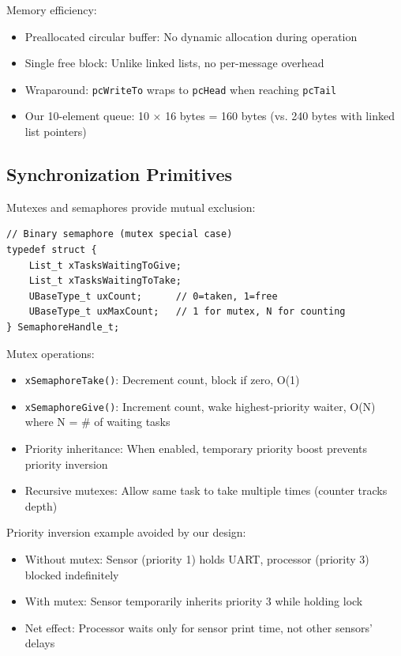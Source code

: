 \documentclass[conference]{IEEEtran}
\begin{document}
Memory efficiency:
\begin{itemize}
    \item Preallocated circular buffer: No dynamic allocation during operation
    \item Single free block: Unlike linked lists, no per-message overhead
    \item Wraparound: \texttt{pcWriteTo} wraps to \texttt{pcHead} when reaching \texttt{pcTail}
    \item Our 10-element queue: 10 × 16 bytes = 160 bytes (vs. 240 bytes with linked list pointers)
\end{itemize}

\subsection{Synchronization Primitives}
Mutexes and semaphores provide mutual exclusion:

\begin{lstlisting}
// Binary semaphore (mutex special case)
typedef struct {
    List_t xTasksWaitingToGive;
    List_t xTasksWaitingToTake;
    UBaseType_t uxCount;      // 0=taken, 1=free
    UBaseType_t uxMaxCount;   // 1 for mutex, N for counting
} SemaphoreHandle_t;
\end{lstlisting}

Mutex operations:
\begin{itemize}
    \item \texttt{xSemaphoreTake()}: Decrement count, block if zero, O(1)
    \item \texttt{xSemaphoreGive()}: Increment count, wake highest-priority waiter, O(N) where N = # of waiting tasks
    \item Priority inheritance: When enabled, temporary priority boost prevents priority inversion
    \item Recursive mutexes: Allow same task to take multiple times (counter tracks depth)
\end{itemize}

Priority inversion example avoided by our design:
\begin{itemize}
    \item Without mutex: Sensor (priority 1) holds UART, processor (priority 3) blocked indefinitely
    \item With mutex: Sensor temporarily inherits priority 3 while holding lock
    \item Net effect: Processor waits only for sensor print time, not other sensors' delays
\end{itemize}
\end{document}
